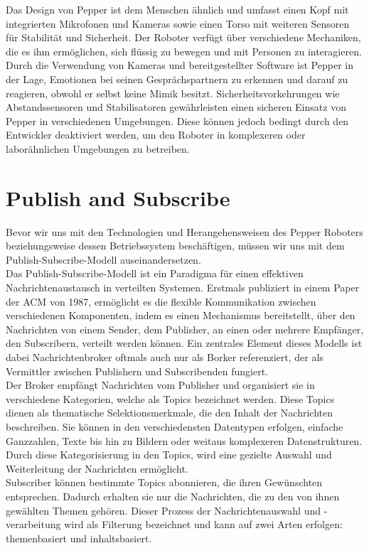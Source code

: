 Das Design von Pepper ist dem Menschen ähnlich und umfasst einen Kopf mit integrierten Mikrofonen und Kameras sowie einen Torso mit weiteren Sensoren für Stabilität und Sicherheit. Der Roboter verfügt über verschiedene Mechaniken, die es ihm ermöglichen, sich flüssig zu bewegen und mit Personen zu interagieren. Durch die Verwendung von Kameras und bereitgestellter Software ist Pepper in der Lage, Emotionen bei seinen Gesprächspartnern zu erkennen und darauf zu reagieren, obwohl er selbst keine Mimik besitzt. Sicherheitsvorkehrungen wie Abstandssensoren und Stabilisatoren gewährleisten einen sicheren Einsatz von Pepper in verschiedenen Umgebungen. Diese können jedoch bedingt durch den Entwickler deaktiviert werden, um den Roboter in komplexeren oder laborähnlichen Umgebungen zu betreiben.

\section{Publish and Subscribe}
\label{sec:PublishAndSubscribe}
Bevor wir uns mit den Technologien und Herangehensweisen des Pepper Roboters beziehungsweise dessen Betriebssystem beschäftigen, müssen wir uns mit dem Publish-Subscribe-Modell auseinandersetzen.\\
Das Publish-Subscribe-Modell ist ein Paradigma für einen effektiven Nachrichtenaustausch in verteilten Systemen. Erstmals publiziert in einem Paper der \ac{ACM} von 1987\cite{wiki_publish_subscribe_pattern}, ermöglicht es die flexible Kommunikation zwischen verschiedenen Komponenten, indem es einen Mechanismus bereitstellt, über den Nachrichten von einem Sender, dem Publisher, an einen oder mehrere Empfänger, den Subscribern, verteilt werden können. Ein zentrales Element dieses Modells ist dabei Nachrichtenbroker oftmals auch nur als Borker referenziert, der als Vermittler zwischen Publishern und Subscribenden fungiert.\\
Der Broker empfängt Nachrichten vom Publisher und organisiert sie in verschiedene Kategorien, welche als Topics bezeichnet werden. Diese Topics dienen als thematische Selektionsmerkmale, die den Inhalt der Nachrichten beschreiben. Sie können in den verschiedensten Datentypen erfolgen, einfache Ganzzahlen, Texte bis hin zu Bildern oder weitaus komplexeren Datenstrukturen. Durch diese Kategorisierung in den Topics, wird eine gezielte Auswahl und Weiterleitung der Nachrichten ermöglicht.\\
Subscriber können bestimmte Topics abonnieren, die ihren Gewünschten entsprechen. Dadurch erhalten sie nur die Nachrichten, die zu den von ihnen gewählten Themen gehören. Dieser Prozess der Nachrichtenauswahl und -verarbeitung wird als Filterung bezeichnet und kann auf zwei Arten erfolgen: themenbasiert und inhaltsbasiert.\\
